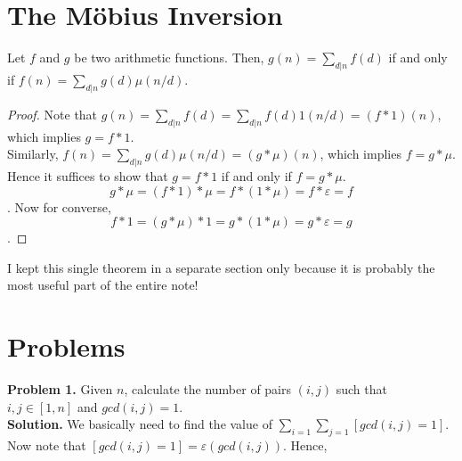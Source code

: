 \documentclass[11pt]{article}
\begin{document}
\section{The M\"{o}bius Inversion}
\begin{theorem}
  Let $f$ and $g$ be two arithmetic functions. Then,  $g(n) = \sum_{d|n} f(d)$ if and only if $f(n) = \sum_{d|n} g(d) \mu(n / d)$.
\end{theorem}
\begin{proof}
 Note that $g(n) = \sum_{d|n} f(d) = \sum_{d|n} f(d) 1(n /d) = (f * 1)(n)$, which implies $g = f * 1$. \\
 Similarly, $f(n) = \sum_{d|n} g(d) \mu(n / d) =  (g * \mu)(n)$, which implies $f = g * \mu.$
 Hence it suffices to show that $g = f * 1$ if and only if $f = g * \mu$. \\
 $$g * \mu = (f * 1) * \mu = f * (1 * \mu) = f * \varepsilon = f$$.
 Now for converse, $$f * 1 = (g * \mu) * 1 = g * (1 * \mu) = g * \varepsilon = g$$.
\end{proof}
I kept this single theorem in a separate section only because it is probably the most useful part of the entire note!
\section{Problems}
\textbf{Problem 1.} Given $n$, calculate the number of pairs $(i, j)$ such that $i, j \in [1, n]$ and $gcd(i, j) = 1$. \\
\textbf{Solution.} We basically need to find the value of $\sum_{i = 1} \sum_{j = 1} [gcd(i, j) = 1]$. Now note that $[gcd(i, j) = 1] = \varepsilon(gcd(i, j))$. Hence,
\end{document}
